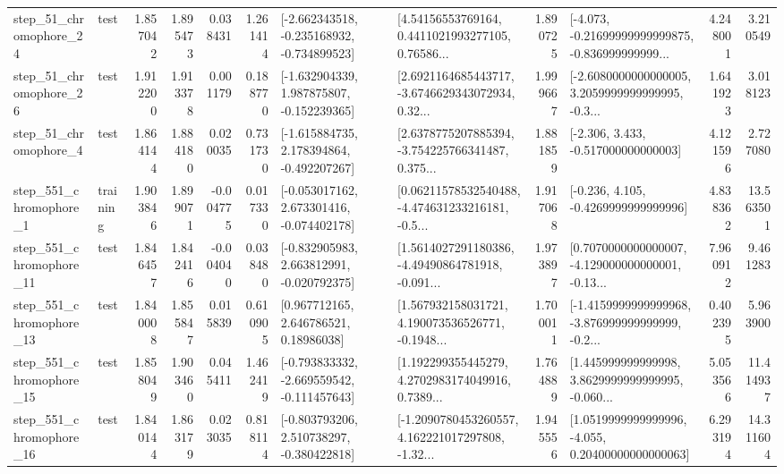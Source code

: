 \begin{tabular}{llrrrrllrlrr}
   step\_51\_chromophore\_24 &      test &      1.857042 &    1.895473 &      0.038431 &  1.261414 &  [-2.662343518, -0.235168932, -0.734899523] &  [4.54156553769164, 0.4411021993277105, 0.76586... &       1.890725 &  [-4.073, -0.21699999999999875, -0.836999999999... &            4.248001 &          3.210549 \\
   step\_51\_chromophore\_26 &      test &      1.912200 &    1.913378 &      0.001179 &  0.188770 &   [-1.632904339, 1.987875807, -0.152239365] &  [2.6921164685443717, -3.6746629343072934, 0.32... &       1.999667 &  [-2.6080000000000005, 3.2059999999999995, -0.3... &            1.641923 &          3.018123 \\
    step\_51\_chromophore\_4 &      test &      1.864144 &    1.884180 &      0.020035 &  0.731730 &   [-1.615884735, 2.178394864, -0.492207267] &  [2.6378775207885394, -3.754225766341487, 0.375... &       1.881859 &                [-2.306, 3.433, -0.517000000000003] &            4.121596 &          2.727080 \\
   step\_551\_chromophore\_1 &  training &      1.903846 &    1.899071 &     -0.004775 &  0.017330 &   [-0.053017162, 2.673301416, -0.074402178] &  [0.06211578532540488, -4.474631233216181, -0.5... &       1.917068 &               [-0.236, 4.105, -0.4269999999999996] &            4.838362 &         13.563501 \\
  step\_551\_chromophore\_11 &      test &      1.846457 &    1.842416 &     -0.004040 &  0.038480 &   [-0.832905983, 2.663812991, -0.020792375] &  [1.5614027291180386, -4.49490864781918, -0.091... &       1.973897 &  [0.7070000000000007, -4.129000000000001, -0.13... &            7.960912 &          9.461283 \\
  step\_551\_chromophore\_13 &      test &      1.840008 &    1.855847 &      0.015839 &  0.610905 &      [0.967712165, 2.646786521, 0.18986038] &  [1.567932158031721, 4.190073536526771, -0.1948... &       1.700011 &  [-1.4159999999999968, -3.876999999999999, -0.2... &            0.402395 &          5.963900 \\
  step\_551\_chromophore\_15 &      test &      1.858049 &    1.903460 &      0.045411 &  1.462419 &  [-0.793833332, -2.669559542, -0.111457643] &  [1.192299355445279, 4.2702983174049916, 0.7389... &       1.764889 &  [1.445999999999998, 3.8629999999999995, -0.060... &            5.053566 &         11.414937 \\
  step\_551\_chromophore\_16 &      test &      1.840144 &    1.863179 &      0.023035 &  0.818114 &   [-0.803793206, 2.510738297, -0.380422818] &  [-1.2090780453260557, 4.162221017297808, -1.32... &       1.945556 &  [1.0519999999999996, -4.055, 0.20400000000000063] &            6.293194 &         14.311604 \\

\end{tabular}
